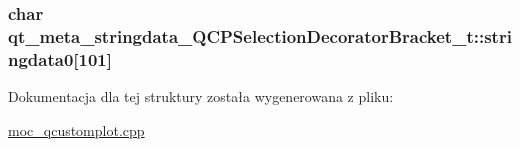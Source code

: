 \subsubsection[{\texorpdfstring{stringdata0}{stringdata0}}]{\setlength{\rightskip}{0pt plus 5cm}char qt\+\_\+meta\+\_\+stringdata\+\_\+\+Q\+C\+P\+Selection\+Decorator\+Bracket\+\_\+t\+::stringdata0\mbox{[}101\mbox{]}}\hypertarget{structqt__meta__stringdata___q_c_p_selection_decorator_bracket__t_a9fdc0589eeaa19fcf4e22afbdbd579cd}{}\label{structqt__meta__stringdata___q_c_p_selection_decorator_bracket__t_a9fdc0589eeaa19fcf4e22afbdbd579cd}


Dokumentacja dla tej struktury została wygenerowana z pliku\+:\begin{DoxyCompactItemize}
\item 
\hyperlink{moc__qcustomplot_8cpp}{moc\+\_\+qcustomplot.\+cpp}\end{DoxyCompactItemize}

